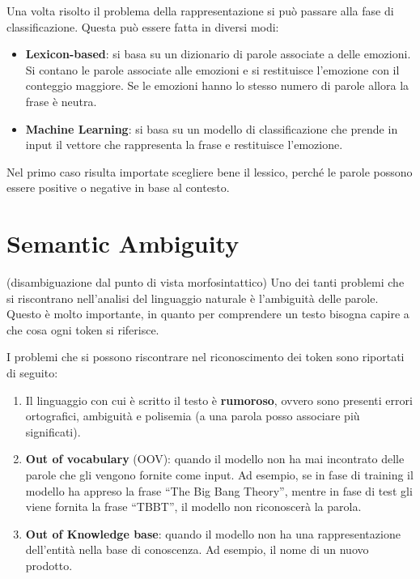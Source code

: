 Una volta risolto il problema della rappresentazione si può passare alla fase
di classificazione. Questa può essere fatta in diversi modi:
\begin{itemize}
      \item \textbf{Lexicon-based}: si basa su un dizionario di parole associate
            a delle emozioni. Si contano le parole associate alle emozioni e si
            restituisce l'emozione con il conteggio maggiore. Se le emozioni hanno
            lo stesso numero di parole allora la frase è neutra.
      \item \textbf{Machine Learning}: si basa su un modello di classificazione
            che prende in input il vettore che rappresenta la frase e restituisce
            l'emozione.
\end{itemize}
\begin{nota}
      Nel primo caso risulta importate scegliere bene il lessico, perché le parole
      possono essere positive o negative in base al contesto.
\end{nota}

\section{Semantic Ambiguity}
 (disambiguazione dal punto di vista morfosintattico)
Uno dei tanti problemi che si riscontrano nell'analisi del linguaggio naturale
è l'ambiguità delle parole. Questo è molto importante, in quanto per comprendere
un testo bisogna capire a che cosa ogni token si riferisce.

I problemi che si possono riscontrare nel riconoscimento dei token sono riportati
di seguito:
\begin{enumerate}
      \item Il linguaggio con cui è scritto il testo è \textbf{rumoroso}, ovvero
            sono presenti errori ortografici, ambiguità e polisemia (a una parola
            posso associare più significati).
      \item \textbf{Out of vocabulary} (OOV): quando il modello non ha mai
            incontrato delle parole che gli vengono fornite come input. Ad esempio,
            se in fase di training il modello ha appreso la frase ``The Big Bang
            Theory'', mentre in fase di test gli viene fornita la frase ``TBBT'',
            il modello non riconoscerà la parola.
      \item \textbf{Out of Knowledge base}: quando il modello non ha una
            rappresentazione dell'entità nella base di conoscenza. Ad esempio,
            il nome di un nuovo prodotto.
\end{enumerate}

